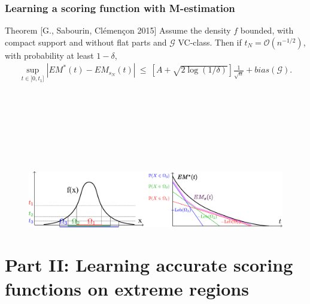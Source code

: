 \documentclass[9pt]{beamer}
\newcommand{\eg}{\emph{e.g.}{}}
\begin{document}
\begin{frame}
\frametitle{Learning a scoring function with M-estimation}

\begin{block}{Theorem {\small [G., Sabourin, Clémençon 2015]}}
Assume the density $f$ bounded, with compact support and without flat parts and $\mathcal{G}$ VC-class.
Then if $t_N = \mathcal{O}(n^{-1/2})$, with probability at least $1-\delta$, %
\begin{align*}
\sup_{t \in ]0,t_1]}|EM^*(t)-EM_{s_N}(t)| ~\le~ \left[A+\sqrt{2\log(1/\delta)}\right]\frac{1}{\sqrt n}+ bias(\mathcal{G}). %
\end{align*}
\end{block}
~\\~\\~\\~\\~\\~\\
\begin{figure}
\includegraphics[width=\linewidth]{sourcefigs/em_optim.pdf}
\end{figure}

\end{frame}


\section{Part II: Learning accurate scoring functions on extreme regions}



\end{document}
